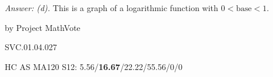 
{\it Answer: (d).} This is a graph of a logarithmic function with $0<\text{base}<1$.

\medskip
by Project MathVote

SVC.01.04.027


HC AS MA120 S12: 5.56/{\bf16.67}/22.22/55.56/0/0  \\
